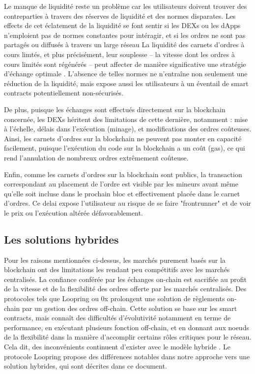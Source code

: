 \documentclass[UTF8,nofonts]{article}
\begin{document}
\begin{multicols}{2}
Le manque de liquidité reste un problème car les utilisateurs doivent trouver des contreparties à travers des réserves de liquidité et des normes disparates. Les effects de cet éclatement de la liquidité se font sentir si les DEXs ou les dApps n'emploient pas de normes constantes pour intéragir, et si les ordres ne sont pas partagés ou diffusés à travers un large réseau La liquidité des carnets d'ordres à cours limtés, et plus précisément, leur souplesse -- la vitesse dont les ordres à cours limités sont régénérés -- peut affecter de manière significative une stratégie d'échange optimale \cite{limitorderliquidity}. L'absence de telles normes ne n'entraîne non seulement une réduction de la liquidité, mais expose aussi les utilisateurs à un éventail de smart contracts potentiellement non-sécurisés.

De plus, puisque les échanges sont effectués directement sur la blockchain concernée, les DEXs héritent des limitations de cette dernière, notamment : mise à l'échelle, délais dans l'exécution (minage), et modifications des ordres coûteuses. Ainsi, les carnets d'ordres sur la blockchain ne peuvent pas monter en capacité facilement, puisque l'exécution du code sur la blockchain a un coût (gas), ce qui rend l'annulation de nombreux ordres extrêmement coûteuse. 

Enfin, comme les carnets d'ordres sur la blockchain sont publics, la transaction correspondant au placement de l'ordre est visible par les mineurs avant même qu'elle soit incluse dans le prochain bloc et effectivement placée dans le carnet d'ordres. Ce delai expose l'utilisateur au risque de se faire "frontrunner" et de voir le prix ou l'exécution altérée défavorablement.

\subsection{Les solutions hybrides}
Pour les raisons mentionnées ci-dessus, les marchés purement basés sur la blockchain ont des limitations les rendant peu compétitifs avec les marchés centralisés. La confiance conférée par les échanges on-chain est sacrifiée au profit de la vitesse et de la flexibilité des ordres offerte par les marchés centralisés. Des protocoles tels que Loopring ou 0x \cite{warren20170x} prolongent une solution de règlements on-chain par un gestion des ordres off-chain. Cette solution se base sur les smart contracts, mais connaît des difficultés d'évolutivité notamment en terme de performance, en exécutant plusieurs fonction off-chain, et en donnant aux noeuds de la flexibilité dans la manière d'accomplir certains rôles critiques pour le réseau. Cela dit, des inconvénients continuent d'exister avec le modèle hybride \cite{costofdecent}. Le protocole Loopring propose des différences notables dans notre approche vers une solution hybrides, qui sont décrites dans ce document.



\end{multicols}
\end{document}
